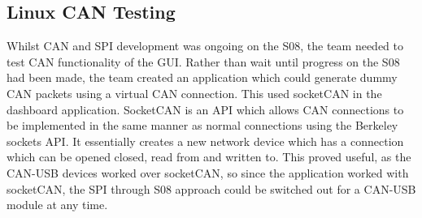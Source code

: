 \documentclass[11pt]{report} %
\begin{document}
	
		\subsection{Linux CAN Testing}
			Whilst CAN and SPI development was ongoing on the S08, the team needed to
			test CAN functionality of the GUI. Rather than wait until progress on the S08 had
			been made, the team created an application which could generate dummy CAN packets using a virtual
			CAN connection.
			This used socketCAN in the dashboard application. SocketCAN is an API which allows CAN 
			connections to be implemented in the same manner as normal connections using the Berkeley
			sockets API. It essentially creates a new network device which has a connection which can be opened
			closed, read from and written to. 
			This proved useful, as the CAN-USB devices worked over socketCAN, so since the application worked
			with socketCAN, the SPI through S08 approach could be switched out for a CAN-USB module at any time.
\end{document}
